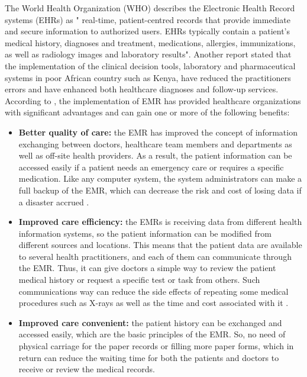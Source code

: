 %
%
The World Health Organization (WHO) \cite{WorldHealthOrganization2016} describes the Electronic Health Record systems (EHRs) as  " real-time, patient-centred records that provide immediate and secure information to authorized users. EHRs typically contain a patient’s medical history, diagnoses and treatment, medications, allergies, immunizations, as well as radiology images and laboratory results". Another report \cite{WorldHealthOrganization2013} stated that the implementation of the clinical decision tools, laboratory and pharmaceutical systems in poor African country such as Kenya, have reduced the practitioners errors and have enhanced both healthcare diagnoses and follow-up services. According to  \cite{OfHealth}, the implementation of EMR has provided healthcare organizations with significant advantages and can gain one or more of the following benefits:
\begin{itemize}
	\item \textbf{Better quality of care:} the EMR has improved the concept of information exchanging between doctors, healthcare team members and departments as well as off-site health providers. As a result, the patient information can be accessed easily if a patient needs an emergency care or requires a specific medication. Like any computer system, the system administrators can make a full backup of the EMR, which can decrease the risk and cost of losing data if a disaster accrued  \cite{OfHealth}.
	\item \textbf{Improved care efficiency:} the EMRs is receiving data from different health information systems, so the patient information can be modified from different sources and locations. This means that the patient data are available to several health practitioners, and each of them can communicate through the EMR. Thus, it can give doctors a simple way to review the patient medical history or request a specific test or task from others. Such communications way can reduce the side effects of repeating some medical procedures such as X-rays as well as the time and cost associated with it \cite{OfHealth}. 
	\item \textbf{Improved care convenient:} the patient history can be exchanged and accessed easily, which are the basic principles of the EMR. So, no need of physical carriage for the paper records or filling more paper forms, which in return can reduce the waiting time for both the patients and doctors to receive or review the medical records\cite{OfHealth}.
\end{itemize}

